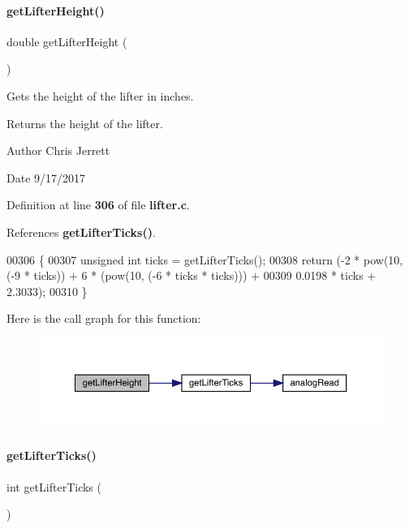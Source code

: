\paragraph{get\+Lifter\+Height()}
{\footnotesize\ttfamily double get\+Lifter\+Height (\begin{DoxyParamCaption}{ }\end{DoxyParamCaption})}



Gets the height of the lifter in inches. 

\begin{DoxyReturn}{Returns}
the height of the lifter. 
\end{DoxyReturn}
\begin{DoxyAuthor}{Author}
Chris Jerrett 
\end{DoxyAuthor}
\begin{DoxyDate}{Date}
9/17/2017 
\end{DoxyDate}


Definition at line \textbf{ 306} of file \textbf{ lifter.\+c}.



References \textbf{ get\+Lifter\+Ticks()}.


\begin{DoxyCode}
00306                          \{
00307   \textcolor{keywordtype}{unsigned} \textcolor{keywordtype}{int} ticks = getLifterTicks();
00308   \textcolor{keywordflow}{return} (-2 * pow(10, (-9 * ticks)) + 6 * (pow(10, (-6 * ticks * ticks))) +
00309           0.0198 * ticks + 2.3033);
00310 \}
\end{DoxyCode}
Here is the call graph for this function\+:
\nopagebreak
\begin{figure}[H]
\begin{center}
\leavevmode
\includegraphics[width=350pt]{lifter_8c_a2719740958fd8a5926f88f6194e820e3_cgraph}
\end{center}
\end{figure}
\mbox{\label{lifter_8c_acdf909159b0406c48099843f2306be78}} 
\paragraph{get\+Lifter\+Ticks()}
{\footnotesize\ttfamily int get\+Lifter\+Ticks (\begin{DoxyParamCaption}{ }\end{DoxyParamCaption})}



